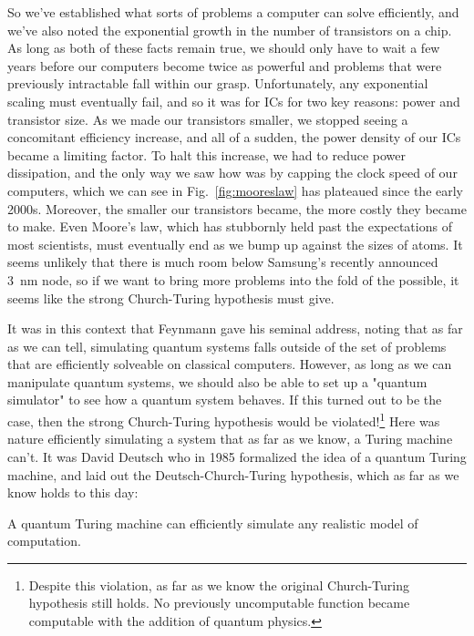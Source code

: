 So we've established what sorts of problems a computer can solve efficiently, and we've also noted the
exponential growth in the number of transistors on a chip. As long as both of these facts remain true, we
should only have to wait a few years before our computers become twice as powerful and problems that were
previously intractable fall within our grasp. Unfortunately, any exponential scaling must eventually fail,
and so it was for ICs for two key reasons: power and transistor size. As we made our transistors smaller,
we stopped seeing a concomitant efficiency increase, and all of a sudden, the power density of our ICs
became a limiting factor. To halt this increase, we had to reduce power dissipation, and the
only way we saw how was by capping the clock speed of our computers, which we can see in Fig.~\ref{fig:mooreslaw}
has plateaued since the early 2000s. Moreover, the smaller our transistors became, the more costly they became
to make. Even Moore's law, which has stubbornly held past the expectations of most scientists, must eventually
end as we bump up against the sizes of atoms. It seems unlikely that there is much room below Samsung's
recently announced \SI{3}{\nano\meter} node, so if we want to bring more problems into the fold of the
possible, it seems like the strong Church-Turing hypothesis must give.

It was in this context that Feynmann gave his seminal address, noting that as far as we can tell, simulating
quantum systems falls outside of the set of problems that are efficiently solveable on classical computers\cite{Feynman1982}.
However, as long as we can manipulate quantum systems, we should also be able to set up a "quantum
simulator" to see how a quantum system behaves. If this turned out to be the case, then the strong
Church-Turing hypothesis would be violated!\footnote{Despite this violation, as far as we know the original
Church-Turing hypothesis still holds. No previously uncomputable function became computable with the addition
of quantum physics.} Here was nature efficiently simulating a system that as far as we know, a Turing machine
can't. It was David Deutsch who in 1985 formalized the idea of a quantum Turing machine\cite{doi:10.1098/rspa.1985.0070},
and laid out the Deutsch-Church-Turing hypothesis, which as far as we know holds to this day:

\begin{displayquote}
  A quantum Turing machine can efficiently simulate any realistic model of computation.
\end{displayquote}

